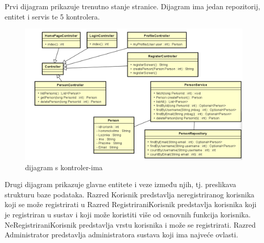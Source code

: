 		Prvi dijagram prikazuje trenutno stanje stranice. Dijagram ima jedan repozitorij, entitet i servis te 5 kontrolera.
		\begin{figure}[H]
			\includegraphics[scale=0.65]{slike/dijagram_razreda2.png} %
			\centering
			\caption{dijagram s kontroler-ima}
			\label{fig:Dijagram_razreda2}
		\end{figure}


		Drugi dijagram prikazuje glavne entitete i veze između njih, 
		tj. preslikava strukturu baze podataka. Razred Korisnik 
		predstavlja neregistriranog korisnika koji se može registrirati 
		u Razred RegistriraniKorisnik predstavlja korisnika koji je registriran u sustav 
		i koji može koristiti više od osnovnih funkcija korisnika. NeRegistriraniKorisnik predstavlja vrstu korisnika i može se registrirati.
		Razred Administrator predstavlja administratora sustava koji ima najveće ovlasti. 



